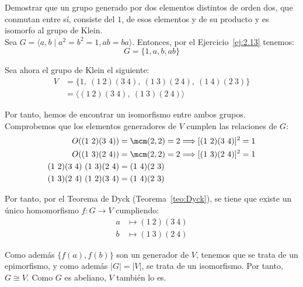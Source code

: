 \begin{ejercicio}\label{ej:2.32}
    Demostrar que un grupo generado por dos elementos distintos de orden dos, que conmutan entre sí, consiste del $1$, de esos elementos y de su producto y es isomorfo al grupo de Klein.\\

    Sea $G=\langle a,b\mid a^2=b^2=1, ab=ba\rangle$. Entonces, por el Ejercicio~\ref{ej:2.13} tenemos:
    \begin{equation*}
        G=\{1,a,b,ab\}
    \end{equation*}

    Sea ahora el grupo de Klein el siguiente:
    \begin{align*}
        V&=\{1,\ (1\ 2)(3\ 4),\ (1\ 3)(2\ 4),\ (1\ 4)(2\ 3)\}\\
        &= \langle (1\ 2)(3\ 4),\ (1\ 3)(2\ 4) \rangle
    \end{align*}

    Por tanto, hemos de encontrar un isomorfismo entre ambos grupos. Comprobemos que los elementos generadores de $V$ cumplen las relaciones de $G$:
    \begin{align*}
        O((1\ 2)(3\ 4))&= \mcm(2,2)=2\Longrightarrow [(1\ 2)(3\ 4)]^2=1\\
        O((1\ 3)(2\ 4))&= \mcm(2,2)=2\Longrightarrow [(1\ 3)(2\ 4)]^2=1\\
        (1\ 2)(3\ 4)\ (1\ 3)(2\ 4)&=(1\ 4)(2\ 3)\\
        (1\ 3)(2\ 4)\ (1\ 2)(3\ 4)&=(1\ 4)(2\ 3)
    \end{align*}

    Por tanto, por el Teorema de Dyck (Teorema~\ref{teo:Dyck}), se tiene que existe un único homomorfismo $f:G\to V$ cumpliendo:
    \begin{align*}
        a &\mapsto (1\ 2)(3\ 4)\\
        b &\mapsto (1\ 3)(2\ 4)
    \end{align*}

    Como además $\{f(a),f(b)\}$ son un generador de $V$, tenemos que se trata de un epimorfismo, y como además $|G|=|V|$, se trata de un isomorfismo. Por tanto, $G\cong V$. Como $G$ es abeliano, $V$ también lo es.
\end{ejercicio}

